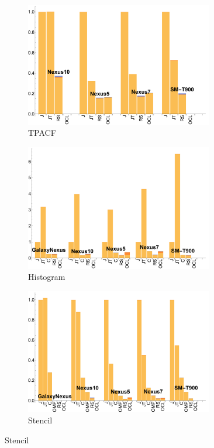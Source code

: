 \begin{figure}
  \begin{subfigure}[b]{0.33\textwidth}
      \centering
      \includegraphics[width=0.9\textwidth]{data/Tpacf_time.pdf}
      \caption{TPACF}
  \end{subfigure}
  \begin{subfigure}[b]{0.33\textwidth}
      \centering
      \includegraphics[width=0.9\textwidth]{data/Histogram_time.pdf}
      \caption{Histogram}
  \end{subfigure}
  \begin{subfigure}[b]{0.33\textwidth}
      \centering
      \includegraphics[width=0.9\textwidth]{data/Stencil_time.pdf}
      \caption{Stencil}
  \end{subfigure}


\end{figure}
